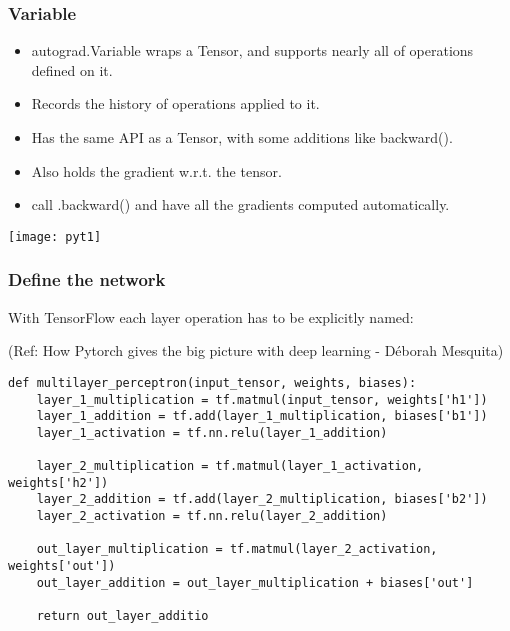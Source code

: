 \begin{frame}[fragile] \frametitle{Variable}
\begin{itemize}
\item autograd.Variable wraps a Tensor, and supports nearly all of operations defined on it.
\item Records the history of operations applied to it. 
\item Has the same API as a Tensor, with some additions like backward(). 
\item Also holds the gradient w.r.t. the tensor.
\item call .backward() and have all the gradients computed automatically.
\end{itemize}
\begin{center}
\texttt{[image: pyt1]}
\end{center}
\end{frame}




\begin{frame}[fragile] \frametitle{Define the network}
 With TensorFlow each layer operation has to be explicitly named:

  {\tiny (Ref: How Pytorch gives the big picture with deep learning - Déborah Mesquita)}

 \begin{lstlisting}
def multilayer_perceptron(input_tensor, weights, biases):
    layer_1_multiplication = tf.matmul(input_tensor, weights['h1'])
    layer_1_addition = tf.add(layer_1_multiplication, biases['b1'])
    layer_1_activation = tf.nn.relu(layer_1_addition)
    
    layer_2_multiplication = tf.matmul(layer_1_activation, weights['h2'])
    layer_2_addition = tf.add(layer_2_multiplication, biases['b2'])
    layer_2_activation = tf.nn.relu(layer_2_addition)
    
    out_layer_multiplication = tf.matmul(layer_2_activation, weights['out'])
    out_layer_addition = out_layer_multiplication + biases['out']
    
    return out_layer_additio
\end{lstlisting}

\end{frame}

